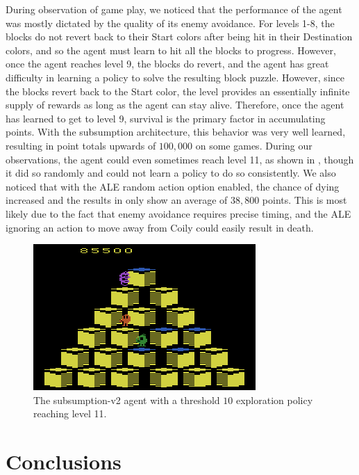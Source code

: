 \documentclass[journal,hidelinks]{IEEEtran}
\begin{document}
During observation of game play, we noticed that the performance of the agent was mostly dictated by the quality of its enemy avoidance. For levels 1-8, the blocks do not revert back to their Start colors after being hit in their Destination colors, and so the agent must learn to hit all the blocks to progress. However, once the agent reaches level 9, the blocks do revert, and the agent has great difficulty in learning a policy to solve the resulting block puzzle. However, since the blocks revert back to the Start color, the level provides an essentially infinite supply of rewards as long as the agent can stay alive. Therefore, once the agent has learned to get to level 9, survival is the primary factor in accumulating points. With the subsumption architecture, this behavior was very well learned, resulting in point totals upwards of $100,000$ on some games. During our observations, the agent could even sometimes reach level 11, as shown in , though it did so randomly and could not learn a policy to do so consistently. We also noticed that with the ALE random action option enabled, the chance of dying increased and the results in  only show an average of $38,800$ points. This is most likely due to the fact that enemy avoidance requires precise timing, and the ALE ignoring an action to move away from Coily could easily result in death.

\begin{figure}[!htb]
  \centering
  \includegraphics[width=0.8\columnwidth]{images/level-11.png}
  \caption{The subsumption-v2 agent with a threshold $10$ exploration policy reaching level 11.}
  \label{fig:level-11}
\end{figure}

\section{Conclusions}
\end{document}
